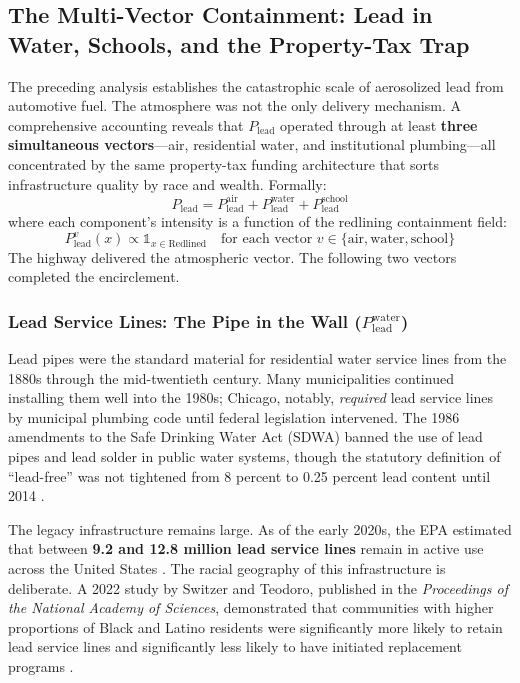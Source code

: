 \subsection{The Multi-Vector Containment: Lead in Water, Schools, and the Property-Tax Trap}

The preceding analysis establishes the catastrophic scale of aerosolized lead from automotive fuel. The atmosphere was not the only delivery mechanism. A comprehensive accounting reveals that $P_{\text{lead}}$ operated through at least \textbf{three simultaneous vectors}---air, residential water, and institutional plumbing---all concentrated by the same property-tax funding architecture that sorts infrastructure quality by race and wealth. Formally:
\begin{equation}\label{eq:9.3-multi-vector-lead-exposure}
P_{\text{lead}} = P_{\text{lead}}^{\text{air}} + P_{\text{lead}}^{\text{water}} + P_{\text{lead}}^{\text{school}}
\end{equation}
where each component's intensity is a function of the redlining containment field:
\begin{equation}\label{eq:9.4-redlining-containment-field}
P_{\text{lead}}^{v}(x) \propto \mathbb{1}_{x \in \text{Redlined}} \quad \text{for each vector } v \in \{\text{air}, \text{water}, \text{school}\}
\end{equation}
The highway delivered the atmospheric vector. The following two vectors completed the encirclement.

\subsubsection{Lead Service Lines: The Pipe in the Wall (\texorpdfstring{$P_{\text{lead}}^{\text{water}}$}{P\_lead\^water})}

Lead pipes were the standard material for residential water service lines from the 1880s through the mid-twentieth century. Many municipalities continued installing them well into the 1980s; Chicago, notably, \textit{required} lead service lines by municipal plumbing code until federal legislation intervened. The 1986 amendments to the Safe Drinking Water Act (SDWA) banned the use of lead pipes and lead solder in public water systems, though the statutory definition of ``lead-free'' was not tightened from 8 percent to 0.25 percent lead content until 2014 \cite{tel_sdwa}.

The legacy infrastructure remains large. As of the early 2020s, the EPA estimated that between \textbf{9.2 and 12.8 million lead service lines} remain in active use across the United States \cite{tel_lsl}. The racial geography of this infrastructure is deliberate. A 2022 study by Switzer and Teodoro, published in the \textit{Proceedings of the National Academy of Sciences}, demonstrated that communities with higher proportions of Black and Latino residents were significantly more likely to retain lead service lines and significantly less likely to have initiated replacement programs \cite{tel_switzer}.

